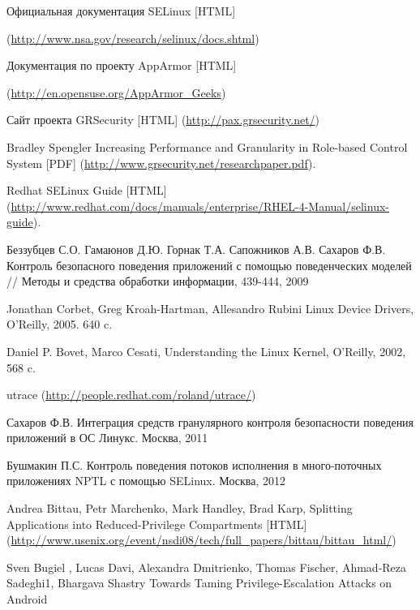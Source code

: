 \begin{thebibliography}{99}
Официальная документация SELinux [HTML] 

(\url{http://www.nsa.gov/research/selinux/docs.shtml})

Документация по проекту AppArmor [HTML]

(\url{http://en.opensuse.org/AppArmor\_Geeks})

Сайт проекта GRSecurity [HTML] 
(\url{http://pax.grsecurity.net/})

Bradley Spengler Increasing Performance and Granularity
in Role-based Control System [PDF]
(\url{http://www.grsecurity.net/researchpaper.pdf}).

 Redhat SELinux Guide [HTML]
 (\url{http://www.redhat.com/docs/manuals/enterprise/RHEL-4-Manual/selinux-guide}).

Беззубцев С.О. Гамаюнов Д.Ю. Горнак Т.А. Сапожников А.В.
Сахаров Ф.В. Контроль безопасного поведения приложений
с помощью поведенческих моделей // Методы и средства обработки информации, 439-444, 2009

Jonathan Corbet, Greg Kroah-Hartman, Allesandro Rubini Linux Device Drivers, O'Reilly, 2005. 640 c.

Daniel P. Bovet, Marco Cesati, Understanding the Linux Kernel, O'Reilly, 2002, 568 c.
 
utrace
(\url{http://people.redhat.com/roland/utrace/})

Сахаров Ф.В. Интеграция средств гранулярного контроля безопасности
поведения приложений в ОС Линукс. Москва, 2011

Бушмакин П.С. Контроль поведения потоков исполнения в много-поточных
приложениях NPTL с помощью SELinux. Москва, 2012


Andrea Bittau, Petr Marchenko, Mark Handley, Brad Karp,
Splitting Applications into Reduced-Privilege Compartments [HTML]
(\url{http://www.usenix.org/event/nsdi08/tech/full\_papers/bittau/bittau\_html/}) 

Sven Bugiel , Lucas Davi, Alexandra Dmitrienko, Thomas Fischer, Ahmad-Reza
Sadeghi1, Bhargava Shastry
Towards Taming Privilege-Escalation Attacks on Android

\end{thebibliography}
